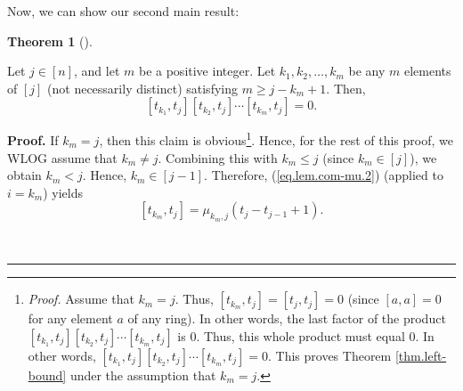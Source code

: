 \documentclass[numbers=enddot,12pt,final,onecolumn,notitlepage]{scrartcl}%
\theoremstyle{definition}
\newtheorem{theo}{Theorem}[section]
\newenvironment{theorem}[1][]
{\begin{theo}[#1]\begin{leftbar}}
{\end{leftbar}\end{theo}}
\newenvironment{proof}[1][Proof]{\noindent\textbf{#1.} }{\ \rule{0.5em}{0.5em}}
\begin{document}
Now, we can show our second main result:


\begin{theorem}
\label{thm.left-bound}Let $j\in\left[  n\right]  $, and let $m$ be a positive
integer. Let $k_{1},k_{2},\ldots,k_{m}$ be any $m$ elements of $\left[
j\right]  $ (not necessarily distinct) satisfying $m\geq j-k_{m}+1$. Then,
\[
\left[  t_{k_{1}},t_{j}\right]  \left[  t_{k_{2}},t_{j}\right]  \cdots\left[
t_{k_{m}},t_{j}\right]  =0.
\]

\end{theorem}


\begin{proof}
If $k_{m}=j$, then this claim is obvious\footnote{\textit{Proof.} Assume that
$k_{m}=j$. Thus, $\left[  t_{k_{m}},t_{j}\right]  =\left[  t_{j},t_{j}\right]
=0$ (since $\left[  a,a\right]  =0$ for any element $a$ of any ring). In other
words, the last factor of the product $\left[  t_{k_{1}},t_{j}\right]  \left[
t_{k_{2}},t_{j}\right]  \cdots\left[  t_{k_{m}},t_{j}\right]  $ is $0$. Thus,
this whole product must equal $0$. In other words, $\left[  t_{k_{1}}%
,t_{j}\right]  \left[  t_{k_{2}},t_{j}\right]  \cdots\left[  t_{k_{m}}%
,t_{j}\right]  =0$. This proves Theorem \ref{thm.left-bound} under the
assumption that $k_{m}=j$.}. Hence, for the rest of this proof, we WLOG assume
that $k_{m}\neq j$. Combining this with $k_{m}\leq j$ (since $k_{m}\in\left[
j\right]  $), we obtain $k_{m}<j$. Hence, $k_{m}\in\left[  j-1\right]  $.
Therefore, (\ref{eq.lem.com-mu.2}) (applied to $i=k_{m}$) yields
\begin{equation}
\left[  t_{k_{m}},t_{j}\right]  =\mu_{k_{m},j}\left(  t_{j}-t_{j-1}+1\right)
. \label{pf.thm.left-bound.1}%
\end{equation}



\end{proof}
\end{document}
